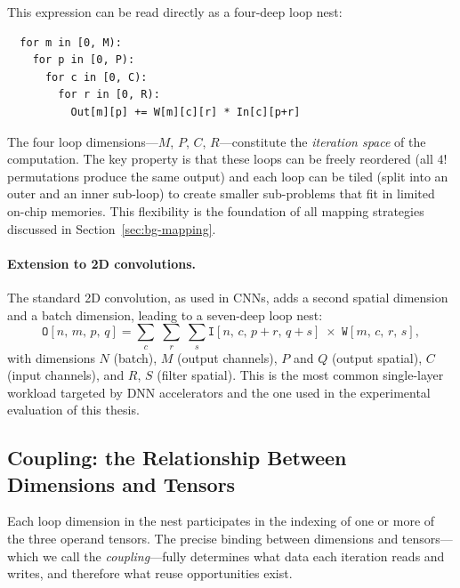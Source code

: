 This expression can be read directly as a four-deep loop nest:

\begin{center}
\begin{minipage}{0.55\textwidth}
\begin{verbatim}
  for m in [0, M):
    for p in [0, P):
      for c in [0, C):
        for r in [0, R):
          Out[m][p] += W[m][c][r] * In[c][p+r]
\end{verbatim}
\end{minipage}
\end{center}

\noindent
The four loop dimensions---$M$, $P$, $C$, $R$---constitute the
\emph{iteration space} of the computation.
The key property is that these loops can be freely reordered (all $4!$
permutations produce the same output) and each loop can be tiled
(split into an outer and an inner sub-loop) to create smaller sub-problems
that fit in limited on-chip memories.
This flexibility is the foundation of all mapping strategies discussed in
Section~\ref{sec:bg-mapping}.

\paragraph{Extension to 2D convolutions.}
The standard 2D convolution, as used in CNNs, adds a second spatial
dimension and a batch dimension, leading to a seven-deep loop nest:
\begin{equation}
\label{eq:2dconv}
\texttt{O}[n,\,m,\,p,\,q]
  = \sum_{c}\;\sum_{r}\;\sum_{s}
    \texttt{I}[n,\,c,\,p{+}r,\,q{+}s] \;\times\;
    \texttt{W}[m,\,c,\,r,\,s],
\end{equation}
with dimensions $N$ (batch), $M$ (output channels), $P$ and $Q$ (output
spatial), $C$ (input channels), and $R$, $S$ (filter spatial).
This is the most common single-layer workload targeted by DNN accelerators
and the one used in the experimental evaluation of this thesis.


\subsection{Coupling: the Relationship Between Dimensions and Tensors}
\label{sec:coupling}

Each loop dimension in the nest participates in the indexing of one or
more of the three operand tensors.
The precise binding between dimensions and tensors---which we call the
\emph{coupling}---fully determines what data each iteration reads and
writes, and therefore what reuse opportunities exist.

